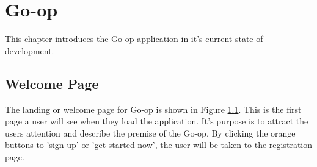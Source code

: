 
\chapter{Go-op} %
\label{Goop} %

This chapter introduces the Go-op application in it's current state of development.

\section{Welcome Page}
\begin{figure}
\centering
{}
\decoRule
\caption[]{}
\label{fig:welpage}
\end{figure}

The landing or welcome page for Go-op is shown in Figure \ref{fig:welpage}. This is the first page a user will see when they load the application. It's purpose is to attract the users attention and describe the premise of the Go-op. By clicking the orange buttons to 'sign up' or 'get started now', the user will be taken to the registration page.\\

